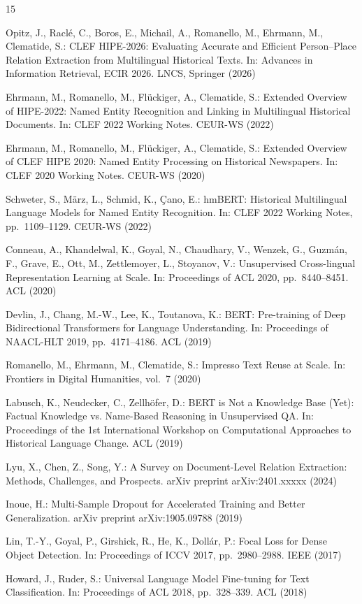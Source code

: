 \begin{thebibliography}{15}

Opitz, J., Racl\'e, C., Boros, E., Michail, A., Romanello, M., Ehrmann, M., Clematide, S.:
CLEF HIPE-2026: Evaluating Accurate and Efficient Person--Place Relation Extraction from Multilingual Historical Texts.
In: Advances in Information Retrieval, ECIR 2026. LNCS, Springer (2026)

Ehrmann, M., Romanello, M., Fl\"uckiger, A., Clematide, S.:
Extended Overview of HIPE-2022: Named Entity Recognition and Linking in Multilingual Historical Documents.
In: CLEF 2022 Working Notes. CEUR-WS (2022)

Ehrmann, M., Romanello, M., Fl\"uckiger, A., Clematide, S.:
Extended Overview of CLEF HIPE 2020: Named Entity Processing on Historical Newspapers.
In: CLEF 2020 Working Notes. CEUR-WS (2020)

Schweter, S., M\"arz, L., Schmid, K., \c{C}ano, E.:
hmBERT: Historical Multilingual Language Models for Named Entity Recognition.
In: CLEF 2022 Working Notes, pp.~1109--1129. CEUR-WS (2022)

Conneau, A., Khandelwal, K., Goyal, N., Chaudhary, V., Wenzek, G., Guzm\'an, F., Grave, E., Ott, M., Zettlemoyer, L., Stoyanov, V.:
Unsupervised Cross-lingual Representation Learning at Scale.
In: Proceedings of ACL 2020, pp.~8440--8451. ACL (2020)

Devlin, J., Chang, M.-W., Lee, K., Toutanova, K.:
BERT: Pre-training of Deep Bidirectional Transformers for Language Understanding.
In: Proceedings of NAACL-HLT 2019, pp.~4171--4186. ACL (2019)

Romanello, M., Ehrmann, M., Clematide, S.:
Impresso Text Reuse at Scale.
In: Frontiers in Digital Humanities, vol.~7 (2020)

Labusch, K., Neudecker, C., Zellh\"ofer, D.:
BERT is Not a Knowledge Base (Yet): Factual Knowledge vs. Name-Based Reasoning in Unsupervised QA.
In: Proceedings of the 1st International Workshop on Computational Approaches to Historical Language Change. ACL (2019)

Lyu, X., Chen, Z., Song, Y.:
A Survey on Document-Level Relation Extraction: Methods, Challenges, and Prospects.
arXiv preprint arXiv:2401.xxxxx (2024)

Inoue, H.:
Multi-Sample Dropout for Accelerated Training and Better Generalization.
arXiv preprint arXiv:1905.09788 (2019)

Lin, T.-Y., Goyal, P., Girshick, R., He, K., Doll\'ar, P.:
Focal Loss for Dense Object Detection.
In: Proceedings of ICCV 2017, pp.~2980--2988. IEEE (2017)

Howard, J., Ruder, S.:
Universal Language Model Fine-tuning for Text Classification.
In: Proceedings of ACL 2018, pp.~328--339. ACL (2018)

\end{thebibliography}


